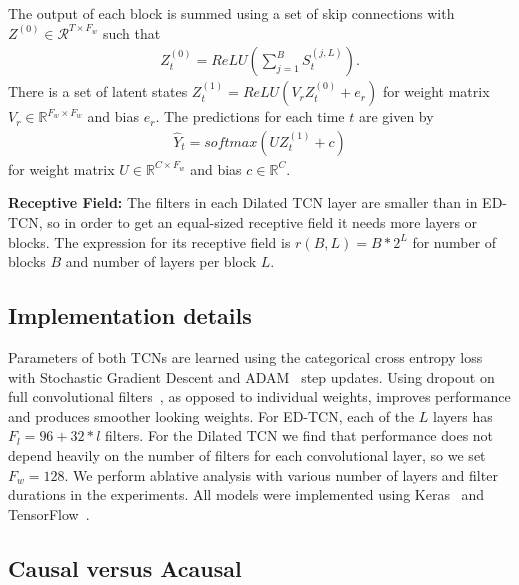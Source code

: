 \documentclass[10pt,twocolumn,letterpaper]{article}
\newcommand{\fakesubsection}[1]{\smallskip\noindent\textbf{#1:}}
\begin{document}
The output of each block is summed using a set of skip connections with $Z^{(0)} \in \mathcal{R}^{T \times F_w}$ such that 
\begin{align}
Z_t^{(0)} = ReLU(\sum_{j=1}^B S_t^{(j,L)}).
\end{align}
There is a set of latent states $Z^{(1)}_t = ReLU(V_r Z^{(0)}_t + e_r)$ for weight matrix $V_r \in \mathbb{R}^{F_w \times F_w}$ and bias $e_r$. 
The predictions for each time $t$ are given by
\begin{align}
\hat{Y}_t = softmax(U Z^{(1)}_t + c)
\end{align}
for weight matrix $U \in \mathbb{R}^{C \times F_w}$ and bias $c \in \mathbb{R}^{C}$.



















\fakesubsection{Receptive Field} The filters in each Dilated TCN layer are smaller than in ED-TCN, so in order to get an equal-sized receptive field it needs more layers or blocks. The expression for its receptive field is $r(B,L)= B*2^L$ for number of blocks $B$ and number of layers per block $L$.

\subsection{Implementation details}
\label{sec:details}
Parameters of both TCNs are learned using the categorical cross entropy loss with Stochastic Gradient Descent and ADAM~\cite{ADAM} step updates. 
Using dropout on full convolutional filters~\cite{tompson_cvpr_2015}, as opposed to individual weights, improves performance and produces smoother looking weights.
For ED-TCN, each of the $L$ layers has $F_l=96 + 32*l$ filters.
For the Dilated TCN we find that performance does not depend heavily on the number of filters for each convolutional layer, so we set $F_w=128$.
We perform ablative analysis with various number of layers and filter durations in the experiments.
All models were implemented using Keras~\cite{keras} and TensorFlow~\cite{tensorflow}.





\subsection{Causal versus Acausal}
\end{document}
